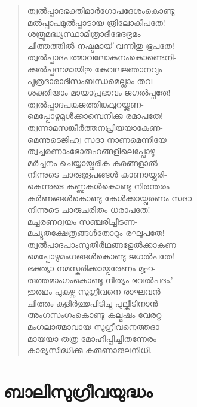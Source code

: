 \begin{verse}
ത്വല്‍പ്പാദഭക്തിമാര്‍ഗോപദേശംകൊണ്ടു\\
മല്‍പ്പാപമുല്‍പ്പാടായ ത്രിലോകീപതേ!\\
ശത്രുമദ്ധ്യസ്ഥാമിത്രാദിഭേദഭ്രമം\\
ചിത്തത്തില്‍ നഷ്ടമായ് വന്നിതു ഭൂപതേ!\\
ത്വല്‍പ്പാദപത്മാവലോകനംകൊണ്ടെനി-\\
ക്കുല്‍പ്പന്നമായിതു കേവലജ്ഞാനവും\\
പുത്രദാരാദിസംബന്ധമെല്ലാം തവ-\\
ശക്തിയാം മായാപ്രഭാവം ജഗല്‍പ്പതേ!\\
ത്വല്‍പ്പാദപങ്കജത്തിങ്കലുറയ്ക്കണ-\\
മെപ്പോഴുമുള്‍ക്കാമ്പെനിക്കു രമാപതേ!\\
ത്വന്നാമസങ്കീര്‍ത്തനപ്രിയയാകേണ-\\
മെന്നുടെജിഹ്വ സദാ നാണമെന്നിയേ\\
ത്വച്ചരണാംഭോരുഹങ്ങളിലെപ്പോഴു-\\
മര്‍ച്ചനം ചെയ്യായ്വരിക കരങ്ങളാല്‍\\
നിന്നുടെ ചാരുരൂപങ്ങള്‍ കാണായ്വരി-\\
കെന്നുടെ കണ്ണുകള്‍കൊണ്ടു നിരന്തരം\\
കര്‍ണങ്ങള്‍കൊണ്ടു കേള്‍ക്കായ്വരണം സദാ\\
നിന്നുടെ ചാരുചരിതം ധരാപതേ!\\
മച്ചരണദ്വയം സഞ്ചരിച്ചീടണ-\\
മച്യുതക്ഷേത്രങ്ങള്‍തോറും രഘുപതേ!\\
ത്വല്‍പാദപാംസുതീര്‍ഥങ്ങളേല്‍ക്കാകണ-\\
മെപ്പോഴുമംഗങ്ങള്‍കൊണ്ടു ജഗല്‍പതേ!\\
ഭക്ത്യാ നമസ്കരിക്കായ്വരേണം മുഹു-\\
രുത്തമാംഗംകൊണ്ടു നിത്യം ഭവല്‍പദം.’\\
ഇത്ഥം പുകഴ്ന്ന സുഗ്രീവനെ രാഘവന്‍\\
ചിത്തം കുളിര്‍ത്തുപിടിച്ചു പുല്കീടിനാന്‍\\
അംഗസംഗംകൊണ്ടു കല്മഷം വേരറ്റ\\
മംഗലാത്മാവായ സുഗ്രീവനെത്തദാ\\
മായയാ തത്ര മോഹിപ്പിച്ചിതന്നേരം\\
കാര്യസിദ്ധിക്കു കരുണാജലനിധി.
\end{verse}


\section{ബാലിസുഗ്രീവയുദ്ധം}

